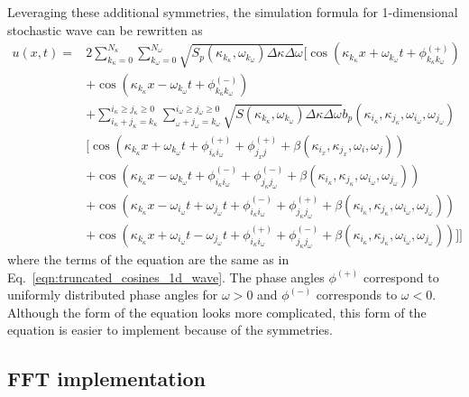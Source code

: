 \documentclass[preprint, review, 12pt]{elsarticle}
\begin{document}
Leveraging these additional symmetries, the simulation formula for 1-dimensional stochastic wave can be rewritten as
\begin{equation}
\begin{aligned}
    u(x, t) = & 2 \sum_{k_\kappa=0}^{N_\kappa}\sum_{k_\omega=0}^{N_\omega}\sqrt{S_{p}(\kappa_{k_\kappa}, \omega_{k_\omega}) \Delta\kappa\Delta\omega} \Bigg[\cos(\kappa_{k_\kappa}x + \omega_{k_\omega} t + \phi_{k_\kappa k_\omega}^{(+)})\\
    & + \cos(\kappa_{k_\kappa}x - \omega_{k_\omega} t + \phi_{k_\kappa k_\omega}^{(-)})\\
    & + \sum_{i_\kappa + j_\kappa = k_\kappa}^{i_\kappa \geq j_\kappa \geq 0}\sum_{_\omega + j_\omega = k_\omega}^{i_\omega \geq j_\omega \geq 0}\sqrt{S(\kappa_{k_\kappa}, \omega_{k_\omega}) \Delta\kappa \Delta\omega } b_{p}(\kappa_{i_\kappa}, \kappa_{j_\kappa}, \omega_{i_\omega}, \omega_{j_\omega})\\
    &\Big[ \cos(\kappa_{k_\kappa}x + \omega_{k_\omega}t + \phi_{i_\kappa i_\omega}^{(+)} + \phi_{j_{x}j}^{(+)} + \beta(\kappa_{i_{x}}, \kappa_{j_{x}}, \omega_{i}, \omega_{j}))\\
    & + \cos(\kappa_{k_\kappa}x - \omega_{k_\omega}t + \phi_{i_\kappa i_\omega}^{(-)} + \phi_{j_\kappa j_\omega}^{(-)} + \beta(\kappa_{i_\kappa}, \kappa_{j_\kappa}, \omega_{i_\omega}, \omega_{j_\omega})) \\
   & + \cos(\kappa_{k_\kappa}x - \omega_{i_\omega}t + \omega_{j_\omega}t + \phi_{i_\kappa i_\omega}^{(-)} + \phi_{j_\kappa j_\omega}^{(+)} + \beta(\kappa_{i_\kappa}, \kappa_{j_\kappa}, \omega_{i_\omega}, \omega_{j_\omega}))\\
   & + \cos(\kappa_{k_\kappa}x + \omega_{i_\omega}t - \omega_{j_\omega}t + \phi_{i_\kappa i_\omega}^{(+)} + \phi_{j_\kappa j_\omega}^{(-)} + \beta(\kappa_{i_\kappa}, \kappa_{j_\kappa}, \omega_{i_\omega}, \omega_{j_\omega})) \Big] \Bigg]
\label{eqn:quadrant_1d_wave}
\end{aligned}
\end{equation}
where the terms of the equation are the same as in Eq.\ \eqref{eqn:truncated_cosines_1d_wave}. The phase angles $\phi^{(+)}$ correspond to uniformly distributed phase angles for $\omega > 0$ and $\phi^{(-)}$ corresponds to $\omega < 0$. Although the form of the equation looks more complicated, this form of the equation is easier to implement because of the symmetries.

\subsection{FFT implementation}
\end{document}
